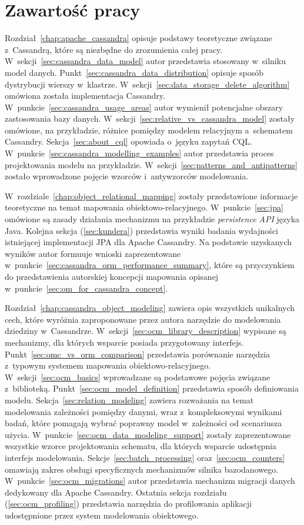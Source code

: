 \section{Zawartość pracy}

Rozdział~\ref{chap:apache_cassandra} opisuje podstawy teoretyczne związane z~Cassandrą, które są niezbędne do zrozumienia całej pracy. W~sekcji~\ref{sec:cassandra_data_model} autor przedstawia stosowany w~silniku model danych. Punkt~\ref{sec:cassandra_data_distribution} opisuje sposób dystrybucji wierszy w~klastrze. W~sekcji~\ref{sec:data_storage_delete_algorithm} omówiona została implementacja Cassandry. W~punkcie~\ref{sec:cassandra_usage_areas} autor wymienił potencjalne obszary zastosowania bazy danych. W~sekcji~\ref{sec:relative_vs_cassandra_model} zostały omówione, na przykładzie, różnice pomiędzy modelem relacyjnym a~schematem Cassandry. Sekcja~\ref{sec:about_cql} opowiada o~języku zapytań CQL. W~punkcie~\ref{sec:cassandra_modelling_examples} autor przedstawia proces projektowania modelu na przykładzie. W~sekcji~\ref{sec:patterns_and_antipatterns} zostało wprowadzone pojęcie wzorców i~antywzorców modelowania.

W~rozdziale~\ref{chap:object_relational_mapping} zostały przedstawione informacje teoretyczne na temat mapowania obiektowo-relacyjnego. W~punkcie~\ref{sec:jpa} omówione są zasady działania mechanizmu na przykładzie \emph{persistence API} języka Java. Kolejna sekcja (\ref{sec:kundera}) przedstawia wyniki badania wydajności istniejącej implementacji JPA dla Apache Cassandry. Na podstawie uzyskanych wyników autor formuuje wnioski zaprezentowane w~punkcie~\ref{sec:cassandra_orm_performance_summary}, które są przyczynkiem do przedstawienia autorskiej koncepcji mapowania opisanej w~punkcie~\ref{sec:om_for_cassandra_concept}.

Rozdział~\ref{chap:cassandra_object_modeling} zawiera opis wszystkich unikalnych cech, które wyróżnia zaproponowane przez autora narzędzie do modelowania dziedziny w~Cassandrze. W~sekcji~\ref{sec:ocm_library_description} wypisane są mechanizmy, dla których wsparcie posiada przygotowany interfejs. Punkt~\ref{sec:omc_vs_orm_comparison} przedstawia porównanie narzędzia z~typowym systemem mapowania obiektowo-relacyjnego. W~sekcji~\ref{sec:ocm_basics} wprowadzane są podstawowe pojęcia związane z~biblioteką. Punkt~\ref{sec:ocm_model_definition} przedstawia sposób definiowania modelu. Sekcja~\ref{sec:relation_modeling} zawiera rozważania na temat modelowania zależności pomiędzy danymi, wraz z~kompleksowymi wynikami badań, które pomagają wybrać poprawny model w~zależności od scenariusza użycia. W~punkcie~\ref{sec:ocm_data_modeling_support} zostały zaprezentowane wszystkie wzorce projektowania schematu, dla których wsparcie udostępnia interfejs modelowania. Sekcje~\ref{sec:batch_processing} oraz~\ref{sec:ocm_counters} omawiają zakres obsługi specyficznych mechanizmów silnika bazodanowego. W~punkcie~\ref{sec:ocm_migrations} autor przedstawia mechanizm migracji danych dedykowany dla Apache Cassandry. Ostatnia sekcja rozdziału (\ref{sec:ocm_profiling}) przedstawia narzędzia do profilowania aplikacji udostępnione przez system modelowania obiektowego.

